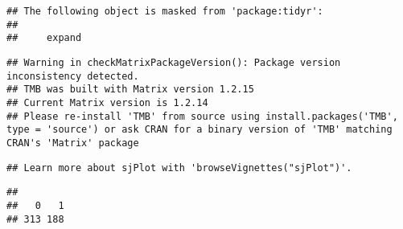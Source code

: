 \documentclass[]{article}
\newenvironment{Shaded}{\begin{snugshade}}{\end{snugshade}}
\newcommand{\KeywordTok}[1]{\textcolor[rgb]{0.13,0.29,0.53}{\textbf{#1}}}
\newcommand{\DataTypeTok}[1]{\textcolor[rgb]{0.13,0.29,0.53}{#1}}
\newcommand{\DecValTok}[1]{\textcolor[rgb]{0.00,0.00,0.81}{#1}}
\newcommand{\StringTok}[1]{\textcolor[rgb]{0.31,0.60,0.02}{#1}}
\newcommand{\CommentTok}[1]{\textcolor[rgb]{0.56,0.35,0.01}{\textit{#1}}}
\newcommand{\OtherTok}[1]{\textcolor[rgb]{0.56,0.35,0.01}{#1}}
\newcommand{\OperatorTok}[1]{\textcolor[rgb]{0.81,0.36,0.00}{\textbf{#1}}}
\newcommand{\NormalTok}[1]{#1}
\begin{document}
\begin{verbatim}
## The following object is masked from 'package:tidyr':
## 
##     expand
\end{verbatim}

\begin{verbatim}
## Warning in checkMatrixPackageVersion(): Package version inconsistency detected.
## TMB was built with Matrix version 1.2.15
## Current Matrix version is 1.2.14
## Please re-install 'TMB' from source using install.packages('TMB', type = 'source') or ask CRAN for a binary version of 'TMB' matching CRAN's 'Matrix' package
\end{verbatim}

\begin{verbatim}
## Learn more about sjPlot with 'browseVignettes("sjPlot")'.
\end{verbatim}

\begin{Shaded}
\end{Shaded}

\begin{verbatim}
## 
##   0   1 
## 313 188
\end{verbatim}

\begin{Shaded}
\end{Shaded}
\end{document}
